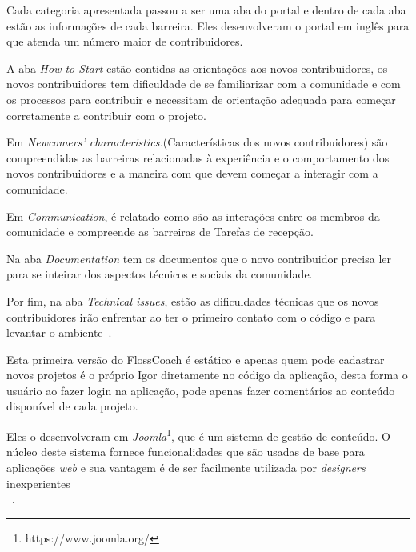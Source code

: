 Cada categoria apresentada passou a ser uma aba do portal e dentro de cada aba 
estão as informações de cada barreira. Eles desenvolveram o portal em inglês
para que atenda um número maior de contribuidores.

A aba \textit{How to Start} estão contidas as orientações aos novos contribuidores, os novos
contribuidores tem dificuldade de se familiarizar com a comunidade e com os processos
para contribuir e necessitam de orientação adequada para começar corretamente a
contribuir com o projeto.

Em \textit{Newcomers’ characteristics.}(Características dos novos contribuidores) são 
compreendidas as barreiras relacionadas à experiência e o comportamento dos novos 
contribuidores e a maneira com que devem começar a interagir com a comunidade.

Em \textit{Communication}, é relatado como são as interações entre 
os membros da comunidade e compreende as barreiras de Tarefas de recepção.

Na aba \textit{Documentation} tem os documentos que o novo contribuidor precisa ler 
para se inteirar dos aspectos técnicos e sociais da comunidade.

Por fim, na aba \textit{Technical issues}, estão as dificuldades técnicas que os novos
contribuidores irão enfrentar ao ter o primeiro contato com o código e para levantar
o ambiente~\cite{steinmancher2015}.

Esta primeira versão do FlossCoach é estático e apenas quem pode cadastrar novos projetos 
é o próprio Igor diretamente no código da aplicação, desta forma o usuário ao fazer login
na aplicação, pode apenas fazer comentários ao conteúdo disponível de cada projeto.

Eles o desenvolveram em \textit{Joomla}\footnote{https://www.joomla.org/}, que 
é um sistema de gestão de conteúdo. O núcleo deste sistema fornece funcionalidades que
são usadas de base para aplicações \textit{web} e sua vantagem é de ser facilmente 
utilizada por \textit{designers} inexperientes\\~\cite{Priefer:2016:JMD:2889160.2889176}.









